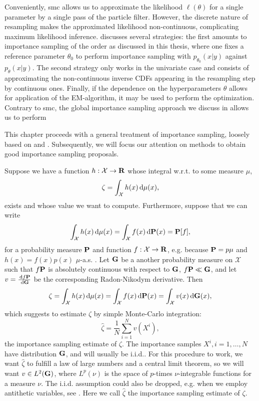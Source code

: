 Conveniently, \gls{smc} allows us to approximate the likelihood $\ell(\theta)$ for a single parameter by a single pass of the particle filter. However, the discrete nature of resampling makes the approximated likelihood non-continuous, complicating maximum likelihood inference. \citep[Chapter 14]{Chopin2020Introduction} discusses several strategies: the first amounts to importance sampling of the order as discussed in this thesis, where one fixes a reference parameter $\theta_{0}$ to perform importance sampling with $p_{\theta_{0}}(x|y)$ against $p_{\theta}(x|y)$. The second strategy only works in the univariate case and consists of approximating the non-continuous inverse CDFs appearing in the resampling step by continuous ones. Finally, if the dependence on the hyperparameters $\theta$ allows for application of the EM-algorithm, it may be used to perform the optimization. 
Contrary to \gls{smc}, the global importance sampling approach we discuss in  allows us to perform 

This chapter proceeds with a general treatment of importance sampling, loosely based on \citep[Chapter 8]{Chopin2020Introduction} and \citep[Chapter 11]{Durbin2012Time}. Subsequently, we will focus our attention on methods to obtain good importance sampling proposals. 

Suppose we have a function $h: \mathcal X \to \R$ whose integral w.r.t. to some measure $\mu$, $$\zeta = \int_{\mathcal X} h(x) \d\mu(x),$$ exists and whose value we want to compute. 
Furthermore, suppose that we can write
$$
    \int_{\mathcal X} h(x) \d \mu(x) = \int_{\mathcal X} f(x) \d \P(x) = \P [f],
$$
for a probability measure $\P$ and function $f: \mathcal X \to \R$, e.g. because $\P = p \mu$ and $h(x) = f(x) p(x)$ $\mu$-a.s. .
Let $\G$ be a another probability measure on $\mathcal X$ such that $f\P$ is absolutely continuous with respect to $\G$, $f\P \ll \G$, and let $v = \frac{\d f\P}{\d\G}$ be the corresponding Radon-Nikodym derivative. Then
$$
    \zeta = \int_{\mathcal X} h(x) \d \mu(x) = \int_{\mathcal X} f(x) \d \P(x) = \int_{\mathcal X} v(x)\d\G(x),
$$
which suggests to estimate $\zeta$ by simple Monte-Carlo integration: $$\hat \zeta = \frac 1 N \sum_{i=1}^{N} v(X^{i}), $$ the importance sampling estimate of $\zeta$. The importance samples $X^{i}, i = 1, \dots, N$ have distribution $\G$, and will usually be i.i.d.. For this procedure to work, we want $\hat \zeta$ to fulfill a law of large numbers and a central limit theorem, so we will want $v \in L^{2}(\G)$, where $L^{p}(\nu)$ is the space of $p$-times $\nu$-integrable functions for a measure $\nu$. The i.i.d. assumption could also be dropped, e.g. when we employ antithetic variables, see \citep[Section 5.3]{Ripley2009Stochastic}. Here we call $\hat \zeta$ the importance sampling estimate of $\zeta$. 

